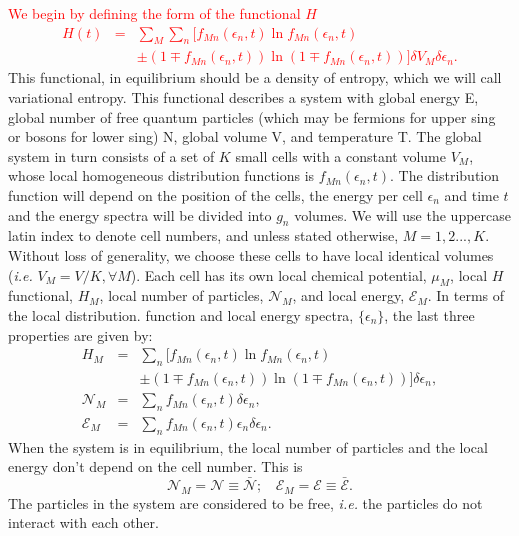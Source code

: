 \documentclass{article}
\begin{document}
\textcolor{red}{We begin by defining the form of the functional $H$
\begin{eqnarray}
    H(t)&=&\sum_{M} \sum_{n} [ f_{Mn}(\epsilon_{n},t) \ln f_{Mn}(\epsilon_{n},t)\nonumber \\
    &&\pm (1 \mp f_{Mn}(\epsilon_{n},t)) \ln (1 \mp f_{Mn}(\epsilon_{n},t)) ] \delta V_M \delta \epsilon_n \label{entropy}.
\end{eqnarray}}
This functional, in equilibrium should be a density of entropy, which we will call variational entropy.
This functional describes a system with global energy E, global number of free
quantum particles (which may be fermions for upper sing or bosons for lower sing) N, global volume V, and temperature T. The
global system in turn consists of a set of $K$ small cells with a constant volume $V_M$, whose local homogeneous distribution functions is $f_{Mn}(\epsilon_{n},t)$. The distribution function will depend on the position of the cells, the energy per cell $\epsilon_{n}$ and time $t$ and the energy spectra will be divided into $g_n$ volumes. We will use the uppercase latin index to denote cell numbers, and unless stated otherwise, $M = 1, 2 . . . , K$. Without loss of generality, we choose these cells to have
local identical volumes (\textit{i.e.} $V_M = V/K, \forall M$). Each cell has its own local chemical potential, $\mu_M$, local
$H$ functional, $H_M$, local number of particles, $\mathcal{N}_M$, and local energy, $\mathcal{E}_M$. In terms of the local distribution.
function and local energy spectra, $\{\epsilon_{n}\}$, the last three properties are given by:
\begin{eqnarray}
    H_M&=&  \sum_{n} [ f_{Mn}(\epsilon_{n},t) \ln f_{Mn}(\epsilon_{n},t)\nonumber \\
    &&\pm (1 \mp f_{Mn}(\epsilon_{n},t)) \ln (1 \mp f_{Mn}(\epsilon_{n},t)) ] \delta \epsilon_n \label{entropycell},\\
    {\mathcal{N}}_M&=& \sum_{n}f_{Mn}(\epsilon_{n} ,t) \delta \epsilon_n, \nonumber \\
{\mathcal{E}}_M&=& \sum_{n}f_{Mn}(\epsilon_{n},t)\epsilon_{n} \delta \epsilon_n.
\end{eqnarray}
When the system is in equilibrium, the local number of particles and the local energy don't depend on the cell number. This is
\begin{equation}
   {\mathcal{N}}_M=\mathcal{N}\equiv \bar{\mathcal{N}}; \ \ \ \  {\mathcal{E}}_M=\mathcal{E}\equiv \bar{\mathcal{E}}.
\end{equation}
The particles in the system are considered to be free, \textit{i.e.} the particles do not interact with each other.
\end{document}
